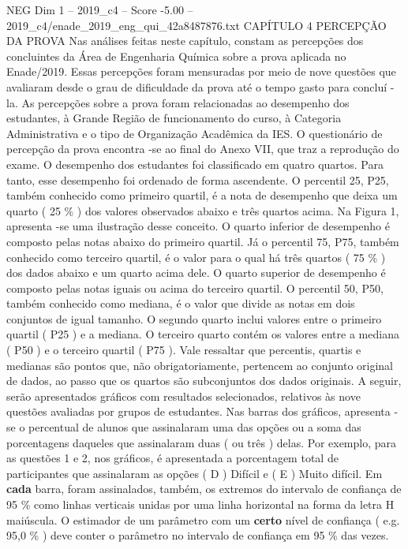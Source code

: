 \begin{textsample}{NEG Dim 1 – 2019\_c4 – Score -5.00 – 2019\_c4/enade\_2019\_eng\_qui\_42a8487876.txt}  \label{ex:f1_neg_090}
CAPÍTULO 4 PERCEPÇÃO DA PROVA Nas análises feitas neste capítulo, constam as percepções dos concluintes da Área de Engenharia Química sobre a prova aplicada no Enade/2019.
Essas percepções foram mensuradas por meio de nove questões que avaliaram desde o grau de dificuldade da prova até o tempo gasto para concluí -la.
As percepções sobre a prova foram relacionadas ao desempenho dos estudantes, à Grande Região de funcionamento do curso, à Categoria Administrativa e o tipo de Organização Acadêmica da IES.
O questionário de percepção da prova encontra -se ao final do Anexo VII, que traz a reprodução do exame.
O desempenho dos estudantes foi classificado em quatro quartos.
Para tanto, esse desempenho foi ordenado de forma ascendente.
O percentil 25, P25, também conhecido como primeiro quartil, é a nota de desempenho que deixa um quarto ( 25 \% ) dos valores observados abaixo e três quartos acima.
Na Figura 1, apresenta -se uma ilustração desse conceito.
O quarto inferior de desempenho é composto pelas notas abaixo do primeiro quartil.
Já o percentil 75, P75, também conhecido como terceiro quartil, é o valor para o qual há três quartos ( 75 \% ) dos dados abaixo e um quarto acima dele.
O quarto superior de desempenho é composto pelas notas iguais ou acima do terceiro quartil.
O percentil 50, P50, também conhecido como mediana, é o valor que divide as notas em dois conjuntos de igual tamanho.
O segundo quarto inclui valores entre o primeiro quartil ( P25 ) e a mediana.
O terceiro quarto contém os valores entre a mediana ( P50 ) e o terceiro quartil ( P75 ).
Vale ressaltar que percentis, quartis e medianas são pontos que, não obrigatoriamente, pertencem ao conjunto original de dados, ao passo que os quartos são subconjuntos dos dados originais.
A seguir, serão apresentados gráficos com resultados selecionados, relativos às nove questões avaliadas por grupos de estudantes.
Nas barras dos gráficos, apresenta -se o percentual de alunos que assinalaram uma das opções ou a soma das porcentagens daqueles que assinalaram duas ( ou três ) delas.
Por exemplo, para as questões 1 e 2, nos gráficos, é apresentada a porcentagem total de participantes que assinalaram as opções ( D ) Difícil e ( E ) Muito difícil.
Em \textbf{cada} barra, foram assinalados, também, os extremos do intervalo de confiança de 95 \% como linhas verticais unidas por uma linha horizontal na forma da letra H maiúscula.
O estimador de um parâmetro com um \textbf{certo} nível de confiança ( e.g. 95,0 \% ) deve conter o parâmetro no intervalo de confiança em 95 \% das vezes.

\end{textsample}
